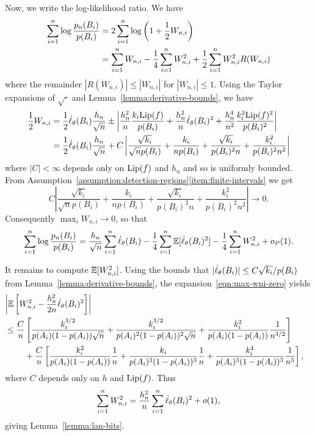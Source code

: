 Now, we write the log-likelihood ratio. We have
\begin{align*}
  \sum_{i = 1}^n \log \frac{p_n(B_i)}{p(B_i)}
  & = 2 \sum_{i = 1}^n \log\left(1 + \frac{1}{2} W_{n,i}\right) \\
  & = \sum_{i = 1}^n W_{n,i}
  - \frac{1}{4} \sum_{i = 1}^n W_{n,i}^2
  + \frac{1}{2} \sum_{i = 1}^n W_{n,i}^2 R(W_{n,i})
\end{align*}
where the remainder $|R(W_{n,i})| \le |W_{n,i}|$ for $|W_{n,i}| \le 1$.
Using the Taylor expansions of $\sqrt{\cdot}$ and
Lemma~\ref{lemma:derivative-bounds}, we have
\begin{align}
  \nonumber
  \frac{1}{2} W_{n,i}
  & = \frac{1}{2} \dot{\ell}_\theta(B_i)
  \frac{h_n}{\sqrt{n}}
  \pm \left|\frac{h_n^2}{n} \frac{k_i {\rm \textup{Lip}}(f)}{p(B_i)}
  + \frac{h_n^2}{n} \dot{\ell}_\theta(B_i)^2
  + \frac{ h_n^4}{n^2} \frac{k_i^2 {\rm \textup{Lip}}(f)^2}{p(B_i)^2}\right| \\
  & = \frac{1}{2} \dot{\ell}_\theta(B_i)
  \frac{h_n}{\sqrt{n}} +
  C \left|\frac{\sqrt{k_i}}{\sqrt{n} p(B_i)}
  + \frac{k_i}{n p(B_i)}
  + \frac{\sqrt{k_i}}{p(B_i)^2 n}
  + \frac{k_i^2}{p(B_i)^2 n^2}
  \right|
  \label{eqn:max-wni-zero}
\end{align}
where $|C| < \infty$ depends only on ${\rm \textup{Lip}}(f)$ and $h_n$ and so is
uniformly bounded. From Assumption~\ref{assumption:detection-regions}\eqref{item:finite-intervals} we get
\[
C \left|\frac{\sqrt{k_i}}{\sqrt{n} p(B_i)}
  + \frac{k_i}{n p(B_i)}
  + \frac{\sqrt{k_i}}{p(B_i)^2 n}
  + \frac{k_i^2}{p(B_i)^2 n^2}
  \right| \to 0. 
\]
Consequently $\max_i W_{n,i} \to 0$, so that
\begin{equation}
  \label{eqn:almost-at-the-end}
  \sum_{i = 1}^n \log \frac{p_n(B_i)}{p(B_i)}
  = \frac{h_n}{\sqrt{n}} \sum_{i = 1}^n \dot{\ell}_\theta(B_i)
  - \frac{1}{4} \sum_{i = 1}^n \mathbb{E}[\dot{\ell}_\theta(B_i)^2]
  - \frac{1}{4} \sum_{i = 1}^n W_{n,i}^2 + o_P(1).
\end{equation}

It remains to compute $\mathbb{E}[W_{n,i}^2]$. Using the bounds
that $|\dot{\ell}_\theta(B_i)| \le C \sqrt{k_i} / p(B_i)$ from
Lemma~\ref{lemma:derivative-bounds},
the
expansion~\eqref{eqn:max-wni-zero}
yields
\begin{align*}
  \lefteqn{\left|\E\left[W_{n,i}^2 - \frac{h_n^2}{2n} \score_\theta(B_i)^2\right]
    \right|} \\
  &
  \le \frac{C}{n} \left[
    \frac{k_i^{3/2}}{p(A_i)(1 - p(A_i)) \sqrt{n}}
    + \frac{k_i^{3/2}}{p(A_i)^2 (1 - p(A_i))^2 \sqrt{n}}
    + \frac{k_i^2}{p(A_i)(1 - p(A_i))} \frac{1}{n^{3/2}}
    \right] \\
  & \qquad ~ +
  \frac{C}{n}
  \left[\frac{k_i^2}{p(A_i)(1 - p(A_i))} \frac{1}{n}
    + \frac{k_i}{p(A_i)^3(1 - p(A_i))^3} \frac{1}{n}
    + \frac{k_i^4}{p(A_i)^3 (1 - p(A_i))^3} \frac{1}{n^3} \right],
\end{align*}
where $C$ depends only on $h$ and ${\rm \textup{Lip}}(f)$.
Thus
\begin{equation*}
  \sum_{i = 1}^n W_{n,i}^2
  = \frac{h_n^2}{n} \sum_{i = 1}^n \dot{\ell}_\theta(B_i)^2
  + o(1),
\end{equation*}
giving Lemma~\ref{lemma:lan-bits}.

